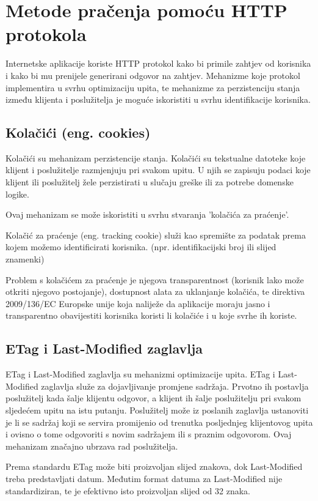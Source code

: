 \documentclass[times, utf8, zavrsni]{fer}
\begin{document}
\section{Metode pračenja pomoću HTTP protokola}
Internetske aplikacije koriste HTTP protokol kako bi primile zahtjev od
korisnika i kako bi mu prenijele generirani odgovor na zahtjev. Mehanizme koje
protokol implementira u svrhu optimizaciju upita, te mehanizme za perzistenciju
stanja između klijenta i poslužitelja je moguće iskoristiti u svrhu
identifikacije korisnika.

\subsection{Kolačići (eng. cookies)}
Kolačići su mehanizam perzistencije stanja.
Kolačići su tekstualne datoteke koje klijent i poslužitelje razmjenjuju pri
svakom upitu. U njih se zapisuju podaci koje klijent ili poslužitelj
žele perzistirati u slučaju greške ili za potrebe domenske logike.

Ovaj mehanizam se može iskoristiti u svrhu stvaranja 'kolačića za praćenje'.

Kolačić za praćenje (eng. tracking cookie) služi kao spremište za podatak
prema kojem možemo identificirati korisnika. (npr. identifikacijski broj ili
slijed znamenki)

Problem s kolačićem za praćenje je njegova transparentnost (korisnik
lako može otkriti njegovo postojanje), dostupnost alata za uklanjanje
kolačića, te direktiva 2009/136/EC Europske unije koja naliježe da
aplikacije moraju jasno i transparentno obavijestiti korisnika koristi li
kolačiće i u koje svrhe ih koriste.

\subsection{ETag i Last-Modified zaglavlja}
ETag i Last-Modified zaglavlja su mehanizmi optimizacije upita.
ETag i Last-Modified zaglavlja služe za dojavljivanje promjene sadržaja.
Prvotno ih postavlja poslužitelj kada šalje klijentu odgovor, a klijent ih
šalje poslužitelju pri svakom sljedećem upitu na istu putanju. Poslužitelj
može iz poslanih zaglavlja ustanoviti je li se sadržaj koji se servira
promijenio od trenutka posljednjeg klijentovog upita i ovisno o tome
odgovoriti s novim sadržajem ili s praznim odgovorom. Ovaj mehanizam
značajno ubrzava rad poslužitelja.

Prema standardu ETag može biti proizvoljan slijed znakova, dok Last-Modified
treba predstavljati datum. Međutim format datuma za Last-Modified nije
standardiziran, te je efektivno isto proizvoljan slijed od 32 znaka.
\end{document}
